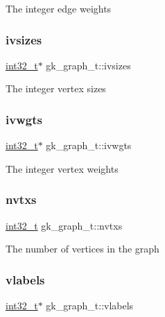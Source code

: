 The integer edge weights \mbox{\label{structgk__graph__t_af90840fb29404bc157231c3975dbc99f}} 
\subsubsection{\texorpdfstring{ivsizes}{ivsizes}}
{\footnotesize\ttfamily \hyperlink{ms__stdint_8h_a37994e3b11c72957c6f454c6ec96d43d}{int32\+\_\+t}$\ast$ gk\+\_\+graph\+\_\+t\+::ivsizes}

The integer vertex sizes \mbox{\label{structgk__graph__t_a25cd4970e41c3ee0bc919b93c9319023}} 
\subsubsection{\texorpdfstring{ivwgts}{ivwgts}}
{\footnotesize\ttfamily \hyperlink{ms__stdint_8h_a37994e3b11c72957c6f454c6ec96d43d}{int32\+\_\+t}$\ast$ gk\+\_\+graph\+\_\+t\+::ivwgts}

The integer vertex weights \mbox{\label{structgk__graph__t_adf27e7e36c8ba4cc586bd37b303db330}} 
\subsubsection{\texorpdfstring{nvtxs}{nvtxs}}
{\footnotesize\ttfamily \hyperlink{ms__stdint_8h_a37994e3b11c72957c6f454c6ec96d43d}{int32\+\_\+t} gk\+\_\+graph\+\_\+t\+::nvtxs}

The number of vertices in the graph \mbox{\label{structgk__graph__t_a720b0b3ecc66fcd7b1f3f280aaf074b4}} 
\subsubsection{\texorpdfstring{vlabels}{vlabels}}
{\footnotesize\ttfamily \hyperlink{ms__stdint_8h_a37994e3b11c72957c6f454c6ec96d43d}{int32\+\_\+t}$\ast$ gk\+\_\+graph\+\_\+t\+::vlabels}

